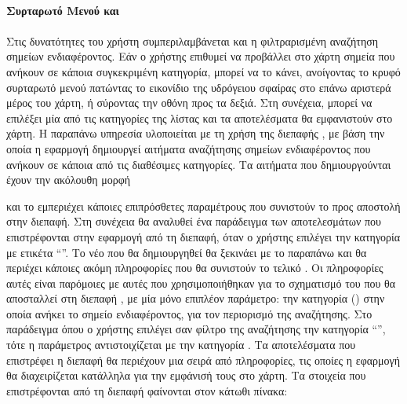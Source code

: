 \paragraph{Συρταρωτό Μενού και }
\paragraph{}
Στις δυνατότητες του χρήστη συμπεριλαμβάνεται και η φιλτραρισμένη αναζήτηση σημείων ενδιαφέροντος. Εάν ο χρήστης επιθυμεί να προβάλλει στο χάρτη σημεία που ανήκουν σε κάποια συγκεκριμένη κατηγορία, μπορεί να το κάνει, ανοίγοντας το κρυφό συρταρωτό μενού πατώντας το εικονίδιο της υδρόγειου σφαίρας στο επάνω αριστερά μέρος του χάρτη, ή σύροντας την οθόνη προς τα δεξιά. Στη συνέχεια, μπορεί να επιλέξει μία από τις κατηγορίες της λίστας και τα αποτελέσματα θα εμφανιστούν στο χάρτη. 
\newpage
Η παραπάνω υπηρεσία υλοποιείται με τη χρήση της διεπαφής , με βάση την οποία η εφαρμογή δημιουργεί αιτήματα αναζήτησης σημείων ενδιαφέροντος που ανήκουν σε κάποια από τις διαθέσιμες κατηγορίες. Τα αιτήματα που δημιουργούνται έχουν την ακόλουθη μορφή

\begin{mdframed}[backgroundcolor=lightgrey] 
\end{mdframed}

\noindent και το  εμπεριέχει κάποιες επιπρόσθετες παραμέτρους που συνιστούν το  προς αποστολή στην διεπαφή. Στη συνέχεια θα αναλυθεί ένα παράδειγμα των αποτελεσμάτων που επιστρέφονται στην εφαρμογή από τη διεπαφή, όταν ο χρήστης επιλέγει την κατηγορία με ετικέτα ``\textit{}''.
\newline
\indent
Το νέο  που θα δημιουργηθεί θα ξεκινάει με το παραπάνω  και θα περιέχει κάποιες ακόμη πληροφορίες που θα συνιστούν το τελικό . Οι πληροφορίες αυτές είναι παρόμοιες με αυτές που χρησιμοποιήθηκαν για το σχηματισμό του  που θα αποσταλλεί στη διεπαφή , με μία μόνο επιπλέον παράμετρο: την κατηγορία () στην οποία ανήκει το σημείο ενδιαφέροντος, για τον περιορισμό της αναζήτησης. Στο παράδειγμα όπου ο χρήστης επιλέγει σαν φίλτρο της αναζήτησης την κατηγορία ``\textit{}'', τότε η παράμετρος  αντιστοιχίζεται με την κατηγορία .
\newline
\indent
Τα αποτελέσματα που επιστρέφει η διεπαφή  θα περιέχουν μια σειρά από πληροφορίες, τις οποίες η εφαρμογή θα διαχειρίζεται κατάλληλα για την εμφάνισή τους στο χάρτη. Τα στοιχεία που επιστρέφονται από τη διεπαφή φαίνονται στον κάτωθι πίνακα:

